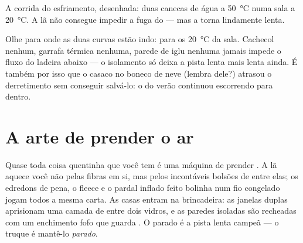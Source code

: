 \begin{omfigure}

{\small A corrida do esfriamento, desenhada: duas canecas de água a
\qty{50}{\celsius} numa sala a \qty{20}{\celsius}. A lã não consegue
impedir a fuga do  --- mas a torna lindamente lenta.}
\end{omfigure}

\begin{remark}\label{rem:g5:heat-and-insulation:onlyslows}
Olhe para onde as duas curvas estão indo: para os
\qty{20}{\celsius} da sala. Cachecol nenhum, garrafa térmica nenhuma,
parede de iglu nenhuma jamais impede o fluxo do  ladeira abaixo
--- o isolamento só deixa a pista lenta mais lenta ainda. É também
por isso que o casaco no boneco de neve (lembra dele?) atrasou o
derretimento sem conseguir salvá-lo: o  do verão continuou
escorrendo para dentro.
\end{remark}

\section{A arte de prender o ar}

\begin{example}\label{ex:g5:heat-and-insulation:air}
Quase toda coisa quentinha que você tem é uma máquina de prender .
A lã aquece você não pelas fibras em si, mas pelos incontáveis
bolsões de  entre elas; os edredons de pena, o fleece e o pardal
inflado feito bolinha num fio congelado jogam todos a mesma carta. As
casas entram na brincadeira: as janelas duplas aprisionam uma camada
de  entre dois vidros, e as paredes isoladas são recheadas com um
enchimento fofo que guarda . O  parado é a pista lenta campeã ---
o truque é mantê-lo \emph{parado}.
\end{example}

